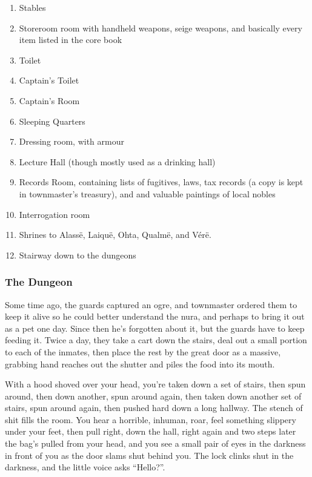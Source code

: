 \begin{multicols}{2}
\begin{enumerate}
	\item{Stables}
	\item{Storeroom room with handheld weapons, seige weapons, and basically every item listed in the core book}
	\item{Toilet}
	\item{Captain's Toilet}
	\item{Captain's Room}
	\item{Sleeping Quarters}
	\item{Dressing room, with armour}
	\item{Lecture Hall (though mostly used as a drinking hall)}
	\item{Records Room, containing lists of fugitives, laws, tax records (a copy is kept in \gls{townmaster}'s treasury), and and valuable paintings of local nobles}
	\item{Interrogation room}
	\item{Shrines to Alass\"{e}, Laiqu\"{e}, Ohta, Qualm\"{e}, and V\'{e}r\"{e}.}
	\item{Stairway down to the dungeons}
\end{enumerate}

\subsubsection{The Dungeon}

Some time ago, the guards captured an ogre, and \gls{townmaster} ordered them to keep it alive so he could better understand the nura, and perhaps to bring it out as a pet one day.  Since then he's forgotten about it, but the guards have to keep feeding it.  Twice a day, they take a cart down the stairs, deal out a small portion to each of the inmates, then place the rest by the great door as a massive, grabbing hand reaches out the shutter and piles the food into its mouth.

\begin{boxtext}

	With a hood shoved over your head, you're taken down a set of stairs, then spun around, then down another, spun around again, then taken down another set of stairs, spun around again, then pushed hard down a long hallway.
	 The stench of shit fills the room.
	 You hear a horrible, inhuman, roar, feel something slippery under your feet, then pull right, down the hall, right again and two steps later the bag's pulled from your head, and you see a small pair of eyes in the darkness in front of you as the door slams shut behind you.
	 The lock clinks shut in the darkness, and the little voice asks ``Hello?''.


\end{boxtext}
\end{multicols}
